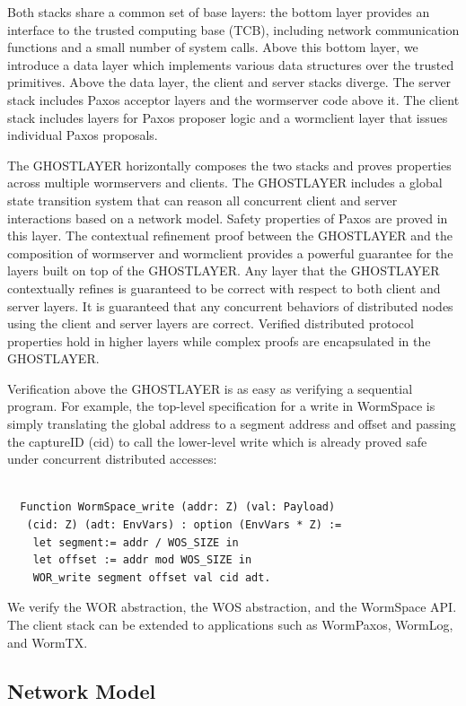 Both stacks share a common set of base layers: the bottom layer provides an interface to the trusted computing base (TCB), including network communication functions and a small number of system calls. Above this bottom layer, we introduce a data layer which implements various data structures over the trusted primitives. Above the data layer, the client and server stacks diverge. The server stack includes Paxos acceptor layers and the wormserver code above it. The client stack includes layers for Paxos proposer logic and a wormclient layer that issues individual Paxos proposals.


	The GHOSTLAYER horizontally composes the two stacks and proves properties across multiple wormservers and clients. The GHOSTLAYER 
	includes a global state transition system
	that can reason all concurrent client and server interactions based on a network model. Safety properties of Paxos are proved in this layer.
The contextual refinement proof between the GHOSTLAYER and the composition of wormserver and wormclient provides a powerful guarantee for the layers built on top of the GHOSTLAYER. Any layer that the GHOSTLAYER contextually refines is guaranteed to be correct with respect to both client and server layers. It is guaranteed that any concurrent behaviors of distributed nodes using the client and server layers are correct. Verified distributed protocol properties hold in higher layers while complex proofs are encapsulated in the GHOSTLAYER.

Verification above the GHOSTLAYER is as easy as verifying a sequential program.
For example, the top-level specification for a write in WormSpace is simply translating the global address to a segment address and offset and passing the captureID (cid) to call the lower-level write which is already proved safe under concurrent distributed accesses:

\begin{lstlisting}[language=mycoq, basicstyle=\small]%, basicstyle=\linespread{0.5}]

  Function WormSpace_write (addr: Z) (val: Payload)
   (cid: Z) (adt: EnvVars) : option (EnvVars * Z) :=
    let segment:= addr / WOS_SIZE in 
    let offset := addr mod WOS_SIZE in
    WOR_write segment offset val cid adt.
\end{lstlisting}
\noindent We verify the WOR abstraction, the WOS abstraction, and the WormSpace API. The client stack can be extended to applications such as WormPaxos, WormLog, and WormTX. 

\subsection{Network Model}\label{subsec:network_modeling}

